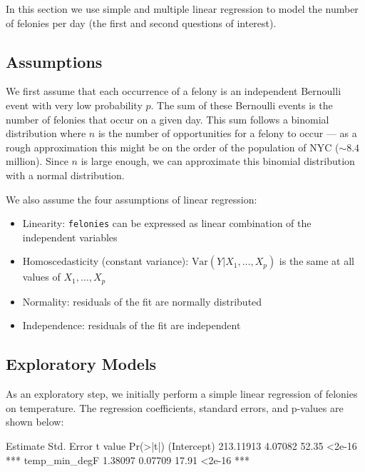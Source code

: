 \documentclass[11pt,notitlepage]{article}
\newenvironment{codeSmall}%
   {\par\noindent\adjustbox{margin=1ex,bgcolor=shadecolor,margin=0ex \medskipamount}\bgroup\minipage\linewidth\verbatim\footnotesize}%
   {\endverbatim\endminipage\egroup}
\begin{document}
In this section we use simple and multiple linear regression to model the number of felonies per day (the first and second questions of interest).

\subsection{Assumptions}
\label{sec:feloniesAssumptions}

We first assume that each occurrence of a felony is an independent Bernoulli event with very low probability $p$. The sum of these Bernoulli events is the number of felonies that occur on a given day. This sum follows a binomial distribution where $n$ is the number of opportunities for a felony to occur --- as a rough approximation this might be on the order of the population of NYC ($\sim 8.4$ million). Since $n$ is large enough, we can approximate this binomial distribution with a normal distribution.

We also assume the four assumptions of linear regression:
\begin{itemize}
\setlength\itemsep{-1pt}

\item Linearity: \texttt{felonies} can be expressed as linear combination of the independent variables
\item Homoscedasticity (constant variance): $\text{Var}(Y|X_1,\ldots, X_p)$ is the same at all values of $X_1,\ldots, X_p$
\item Normality: residuals of the fit are normally distributed
\item Independence: residuals of the fit are independent
\end{itemize}


\subsection{Exploratory Models}

As an exploratory step, we initially perform a simple linear regression of felonies on temperature. The regression coefficients, standard errors, and p-values are shown below: 

\begin{codeSmall}
               Estimate Std. Error t value Pr(>|t|)    
(Intercept)   213.11913    4.07082   52.35   <2e-16 ***
temp_min_degF   1.38097    0.07709   17.91   <2e-16 ***
\end{codeSmall}
\end{document}
